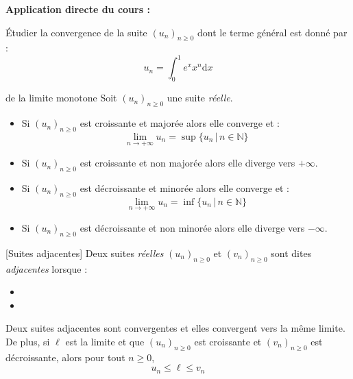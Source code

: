 \documentclass[french,11pt,twoside]{VcCours}
\newenvironment{ApplicationDirecte}{\textbf{Application directe du cours :}

}{}
\newcommand{\dx}{\text{d}x}
\begin{document}
\begin{ApplicationDirecte} Étudier la convergence de la suite $(u_n)_{n \geq 0}$ dont le terme général est donné par :
$$ u_n = \int_0^1 e^x x^n \dx$$
\end{ApplicationDirecte}

\begin{Theoreme}{de la limite monotone} Soit $(u_n)_{n \geq 0}$ une suite \emph{réelle}.


\begin{itemize}
\item Si $(u_n)_{n \geq 0}$ est croissante et majorée alors elle converge et :
$$\lim_{n \rightarrow + \infty} u_n = \sup \lbrace u_n \, \vert \, n \in \mathbb{N} \rbrace $$
\item Si $(u_n)_{n \geq 0}$ est croissante et non majorée alors elle diverge vers $+ \infty$.
\item Si $(u_n)_{n \geq 0}$ est décroissante et minorée alors elle converge et :
$$\lim_{n \rightarrow + \infty} u_n = \inf \lbrace u_n \, \vert \, n \in \mathbb{N} \rbrace $$
\item Si $(u_n)_{n \geq 0}$ est décroissante et non minorée alors elle diverge vers $- \infty$.
\end{itemize}
\end{Theoreme}

\begin{Definition}{}[Suites adjacentes]
Deux suites \emph{réelles} $(u_n)_{n \geq 0}$ et $(v_n)_{n \geq 0}$ sont dites \emph{adjacentes} lorsque :
\begin{itemize}
\item
\item 
\end{itemize}
\end{Definition}

\begin{Theoreme}{}
Deux suites adjacentes sont convergentes et elles convergent vers la même limite. De plus, si $\ell$ est la limite et que $(u_n)_{n \geq 0}$ est croissante et $(v_n)_{n \geq 0}$ est décroissante, alors pour tout $n \geq 0$,
$$ u_n \leq \ell \leq v_n $$
\end{Theoreme}
\end{document}
